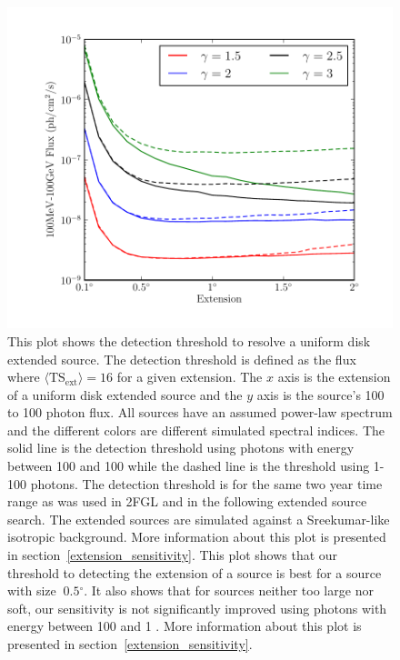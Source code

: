 \documentclass[12pt,preprint]{aastex}
\newcommand{\mev}{\text{MeV}\xspace}
\newcommand{\gev}{\text{GeV}\xspace}
\newcommand{\tsext}{{\ensuremath{\text{TS}_{\text{ext}}}}\xspace}
\renewcommand{\deg}{\ensuremath{^\circ}\xspace}
\begin{document}
\clearpage

\begin{figure}
  \begin{center}
    \includegraphics{mc_plots/index_sensitivity.pdf}
    \end{center}
    \caption{
    This plot shows the detection threshold to resolve a uniform
    disk extended source.  The detection threshold is defined as the flux where
    $\langle\tsext\rangle=16$ for a given extension.  The $x$ axis is
    the extension of a uniform disk extended source and the $y$ axis
    is the source's 100 \mev to 100 \gev photon flux.  All sources have
    an assumed power-law spectrum and the different colors are different
    simulated spectral indices.  The solid line is the detection threshold
    using photons with energy between 100 \mev and 100 \gev while the
    dashed line is the threshold using 1-100 \gev photons. The detection threshold is for the same two year time
    range as was used in 2FGL and in the following extended source search.
    The extended sources are simulated against
  a Sreekumar-like isotropic background.  More information
    about this plot is presented in section~\ref{extension_sensitivity}.
    This plot shows that our threshold to detecting the extension of
    a source is best for a source with size $~0.5\deg$. It also shows
    that for sources neither too large nor soft, our sensitivity is not
    significantly improved using photons with energy between 100 \mev
    and 1 \gev. More information about this plot is presented
    in section~\ref{extension_sensitivity}.
    }\label{index_sensitivity}
  \end{figure}
\end{document}
